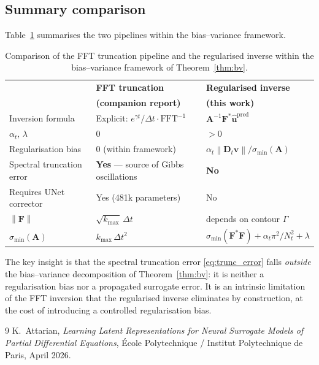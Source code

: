 \documentclass[11pt, a4paper]{article}
\newcommand{\norm}[1]{\left\|#1\right\|}
\begin{document}
\subsection{Summary comparison}
 
Table~\ref{tab:comparison} summarises the two pipelines within the
bias--variance framework.
 
\begin{table}[htbp]
  \centering
  \renewcommand{\arraystretch}{1.5}
  \begin{tabular}{p{4.5cm} p{5.5cm} p{5.5cm}}
    \hline
    & \textbf{FFT truncation} & \textbf{Regularised inverse} \\
    & \textbf{(companion report)} & \textbf{(this work)} \\
    \hline
    Inversion formula
      & Explicit: $e^{\gamma t}/\Delta t \cdot \mathrm{FFT}^{-1}$
      & $\mathbf{A}^{-1}\mathbf{F}^*\hat{\mathbf{u}}^{\mathrm{pred}}$ \\
    $\alpha_t,\,\lambda$
      & $0$
      & $> 0$ \\
    Regularisation bias
      & $0$ (within framework)
      & $\alpha_t\norm{\mathbf{D}_t\mathbf{v}}/\sigma_{\min}(\mathbf{A})$ \\
    Spectral truncation error
      & \textbf{Yes} --- source of Gibbs oscillations
      & \textbf{No} \\
    Requires UNet corrector
      & Yes (481k parameters)
      & No \\
    $\norm{\mathbf{F}}$
      & $\sqrt{k_{\max}}\,\Delta t$
      & depends on contour $\Gamma$ \\
    $\sigma_{\min}(\mathbf{A})$
      & $k_{\max}\,\Delta t^2$
      & $\sigma_{\min}(\mathbf{F}^*\mathbf{F}) + \alpha_t\pi^2/N_t^2 + \lambda$ \\
    \hline
  \end{tabular}
  \caption{Comparison of the FFT truncation pipeline and the regularised
           inverse within the bias--variance framework of
           Theorem~\ref{thm:bv}.}
  \label{tab:comparison}
\end{table}
 
The key insight is that the spectral truncation error \eqref{eq:trunc_error}
falls \emph{outside} the bias--variance decomposition of
Theorem~\ref{thm:bv}: it is neither a regularisation bias nor a propagated
surrogate error. It is an intrinsic limitation of the FFT inversion that
the regularised inverse eliminates by construction, at the cost of
introducing a controlled regularisation bias.

 
\begin{thebibliography}{9}
K.~Attarian,
\textit{Learning Latent Representations for Neural Surrogate Models of
Partial Differential Equations},
\'Ecole Polytechnique / Institut Polytechnique de Paris, April 2026.
\end{thebibliography}
\end{document}
